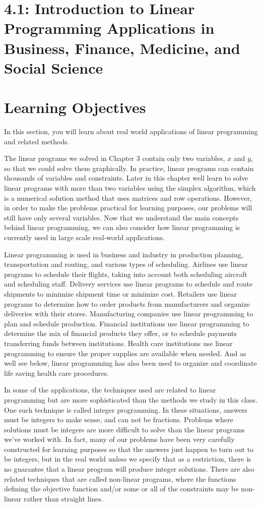 \section*{4.1: Introduction to Linear Programming Applications in Business, Finance, Medicine, and Social Science}

\section*{Learning Objectives}

In this section, you will learn about real world applications of linear programming and related methods.

The linear programs we solved in Chapter 3 contain only two variables, $x$ and $y$, so that we could solve them graphically. In practice, linear programs can contain thousands of variables and constraints. Later in this chapter well learn to solve linear programs with more than two variables using the simplex algorithm, which is a numerical solution method that uses matrices and row operations. However, in order to make the problems practical for learning purposes, our problems will still have only several variables. Now that we understand the main concepts behind linear programming, we can also consider how linear programming is currently used in large scale real-world applications.

Linear programming is used in business and industry in production planning, transportation and routing, and various types of scheduling. Airlines use linear programs to schedule their flights, taking into account both scheduling aircraft and scheduling staff. Delivery services use linear programs to schedule and route shipments to minimize shipment time or minimize cost. Retailers use linear programs to determine how to order products from manufacturers and organize deliveries with their stores. Manufacturing companies use linear programming to plan and schedule production. Financial institutions use linear programming to determine the mix of financial products they offer, or to schedule payments transferring funds between institutions. Health care institutions use linear programming to ensure the proper supplies are available when needed. And as well see below, linear programming has also been used to organize and coordinate life saving health care procedures.

In some of the applications, the techniques used are related to linear programming but are more sophisticated than the methods we study in this class. One such technique is called integer programming. In these situations, answers must be integers to make sense, and can not be fractions. Problems where solutions must be integers are more difficult to solve than the linear programs we've worked with. In fact, many of our problems have been very carefully constructed for learning purposes so that the answers just happen to turn out to be integers, but in the real world unless we specify that as a restriction, there is no guarantee that a linear program will produce integer solutions. There are also related techniques that are called non-linear programs, where the functions defining the objective function and/or some or all of the constraints may be non-linear rather than straight lines.


